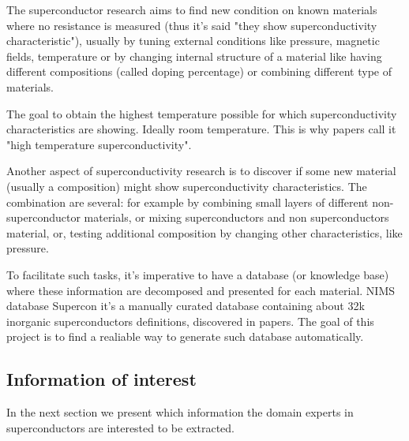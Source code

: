 \documentclass{article}
\begin{document}
The superconductor research aims to find new condition on known materials where no resistance is measured (thus it's said "they show superconductivity characteristic"), usually by tuning external conditions like pressure, magnetic fields, temperature or by changing internal structure of a material like having different compositions (called doping percentage) or combining different type of materials.

The goal to obtain the highest temperature possible for which superconductivity characteristics are showing. Ideally room temperature. This is why papers call it "high temperature superconductivity". 

Another aspect of superconductivity research is to discover if some new material (usually a composition) might show superconductivity characteristics. The combination are several: for example by combining small layers of different non-superconductor materials, or mixing superconductors and non superconductors material, or, testing additional composition by changing other characteristics, like pressure. 

To facilitate such tasks, it's imperative to have a database (or knowledge base) where these information are decomposed and presented for each material. 
NIMS database Supercon it's a manually curated database containing about 32k inorganic superconductors definitions, discovered in papers. 
The goal of this project is to find a realiable way to generate such database automatically. 

\subsection{Information of interest}
In the next section we present which information the domain experts in superconductors are interested to be extracted. 
\end{document}
